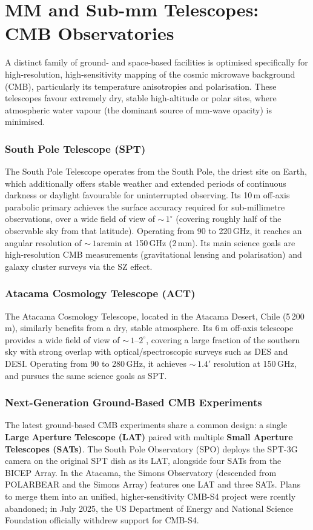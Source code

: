 \section{MM and Sub-mm Telescopes: CMB Observatories} \label{sec:mm_cmb}

A distinct family of ground- and space-based facilities is optimised specifically for high-resolution, high-sensitivity mapping of the cosmic microwave background (CMB), particularly its temperature anisotropies and polarisation. These telescopes favour extremely dry, stable high-altitude or polar sites, where atmospheric water vapour (the dominant source of mm-wave opacity) is minimised.


\subsubsection{South Pole Telescope (SPT)}
The South Pole Telescope operates from the South Pole, the driest site on Earth, which additionally offers stable weather and extended periods of continuous darkness or daylight favourable for uninterrupted observing. Its 10\,m off-axis parabolic primary achieves the surface accuracy required for sub-millimetre observations, over a wide field of view of ${\sim}\,1^\circ$ (covering roughly half of the observable sky from that latitude). Operating from 90 to 220\,GHz, it reaches an angular resolution of ${\sim}\,1 \mathrm{arcmin}$ at 150\,GHz (2\,mm). Its main science goals are high-resolution CMB measurements (gravitational lensing and polarisation) and galaxy cluster surveys via the SZ effect.

\subsubsection{Atacama Cosmology Telescope (ACT)}
The Atacama Cosmology Telescope, located in the Atacama Desert, Chile (5\,200\,m), similarly benefits from a dry, stable atmosphere. Its 6\,m off-axis telescope provides a wide field of view of ${\sim}\,1$--$2^\circ$, covering a large fraction of the southern sky with strong overlap with optical/spectroscopic surveys such as DES and DESI. Operating from 90 to 280\,GHz, it achieves ${\sim}\,1.4'$ resolution at 150\,GHz, and pursues the same science goals as SPT.

\subsubsection{Next-Generation Ground-Based CMB Experiments}
The latest ground-based CMB experiments share a common design: a single \textbf{Large Aperture Telescope (LAT)} paired with multiple \textbf{Small Aperture Telescopes (SATs)}. The South Pole Observatory (SPO) deploys the SPT-3G camera on the original SPT dish as its LAT, alongside four SATs from the BICEP Array. In the Atacama, the Simons Observatory (descended from POLARBEAR and the Simons Array) features one LAT and three SATs. Plans to merge them into an unified, higher-sensitivity CMB-S4 project were rcently abandoned; in July 2025, the US Department of Energy and National Science Foundation officially withdrew support for CMB-S4.

